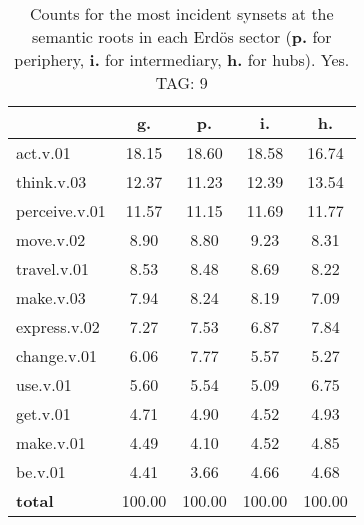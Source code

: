 \begin{table}[h!]
\begin{center}
\begin{tabular}{| l | c | c | c | c |}\hline
 & g. & p. & i. & h. \\\hline
act.v.01 & 18.15  & 18.60  & 18.58  & 16.74 \\\hline
think.v.03 & 12.37  & 11.23  & 12.39  & 13.54 \\\hline
perceive.v.01 & 11.57  & 11.15  & 11.69  & 11.77 \\\hline
move.v.02 & 8.90  & 8.80  & 9.23  & 8.31 \\\hline
travel.v.01 & 8.53  & 8.48  & 8.69  & 8.22 \\\hline
make.v.03 & 7.94  & 8.24  & 8.19  & 7.09 \\\hline
express.v.02 & 7.27  & 7.53  & 6.87  & 7.84 \\\hline
change.v.01 & 6.06  & 7.77  & 5.57  & 5.27 \\\hline
use.v.01 & 5.60  & 5.54  & 5.09  & 6.75 \\\hline
get.v.01 & 4.71  & 4.90  & 4.52  & 4.93 \\\hline
make.v.01 & 4.49  & 4.10  & 4.52  & 4.85 \\\hline
be.v.01 & 4.41  & 3.66  & 4.66  & 4.68 \\\hline
{{\bf total}} & 100.00  & 100.00  & 100.00  & 100.00 \\\hline
\end{tabular}
\caption{Counts for the most incident synsets at the semantic roots in each Erd\"os sector ({\bf p.} for periphery, {\bf i.} for intermediary, {\bf h.} for hubs). Yes. TAG: 9}
\end{center}
\end{table}